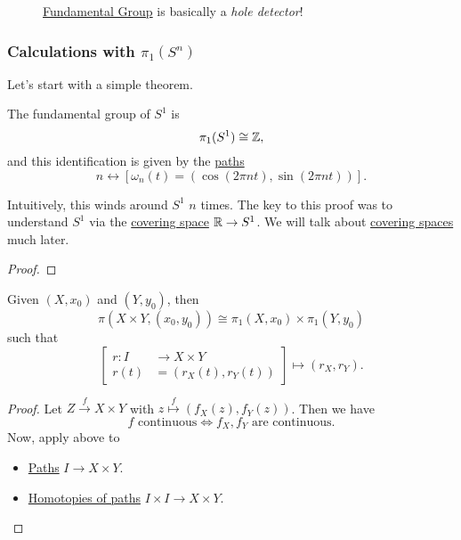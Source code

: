 \begin{figure}[H]
	\centering
	\caption{\hyperref[def:fundamental-group]{Fundamental Group} is basically a \emph{hole detector}!}
	\label{fig:fundamental-group-hole-detector}
\end{figure}

\subsubsection{Calculations with \(\pi _1(S^n)\)}
Let's start with a simple theorem.
\begin{theorem}
	The fundamental group of \(S^1\) is
	\[
		\pi _1(S^1)\cong \mathbb{\MakeUppercase{z}},
	\]
	and this identification is given by the \hyperref[def:path]{paths}
	\[
		n \leftrightarrow [\omega_{n}(t) = (\cos (2\pi nt), \sin (2\pi nt))].
	\]
\end{theorem}
\begin{remark}
	Intuitively, this winds around \(S^1\) \(n\) times. The key to this proof was to understand \(S^1\) via the \hyperref[def:covering-space]{covering space}
	\(\mathbb{\MakeUppercase{r}} \to S^1\). We will talk about \hyperref[def:covering-space]{covering spaces} much later.
\end{remark}
\begin{proof}
\end{proof}

\begin{theorem}
	Given \((X, x_0)\) and \((Y, y_0)\), then
	\[
		\pi (X\times Y, (x_0, y_0)) \cong \pi_1(X, x_0)\times \pi _1(Y, y_0)
	\]
	such that
	\[
		\left[\begin{alignedat}{3}
				r\colon I&\to X\times Y\\
				r(t) &= \left(r_X(t), r_Y(t)\right)
			\end{alignedat}\right] \mapsto (r_{X}, r_{Y}).
	\]
\end{theorem}
\begin{proof}
	Let \(Z\overset{f}{\to} X\times Y\) with \(z\overset{f}{\mapsto} \left(f_{X}(z), f_{Y}(z)\right)\). Then we have
	\[
		f\text{ continuous}\iff f_{X}, f_{Y}  \text{ are continuous}.
	\]
	Now, apply above to
	\begin{itemize}
		\item \hyperref[def:path]{Paths} \(I\to X\times Y\).
		\item \hyperref[def:homotopy-path]{Homotopies of paths} \(I\times I\to X\times Y\).
	\end{itemize}
\end{proof}

